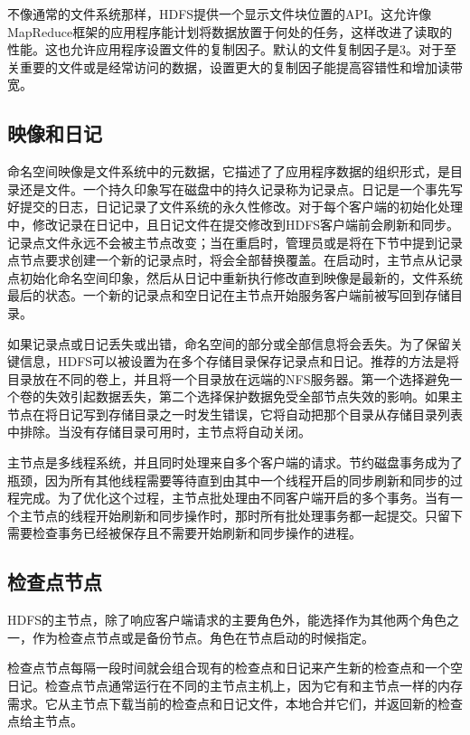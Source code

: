 不像通常的文件系统那样，HDFS提供一个显示文件块位置的API。这允许像MapReduce框架的应用程序能计划将数据放置于何处的任务，这样改进了读取的性能。这也允许应用程序设置文件的复制因子。默认的文件复制因子是3。对于至关重要的文件或是经常访问的数据，设置更大的复制因子能提高容错性和增加读带宽。

\subsection{映像和日记}

命名空间映像是文件系统中的元数据，它描述了了应用程序数据的组织形式，是目录还是文件。一个持久印象写在磁盘中的持久记录称为记录点。日记是一个事先写好提交的日志，日记记录了文件系统的永久性修改。对于每个客户端的初始化处理中，修改记录在日记中，且日记文件在提交修改到HDFS客户端前会刷新和同步。记录点文件永远不会被主节点改变；当在重启时，管理员或是将在下节中提到记录点节点要求创建一个新的记录点时，将会全部替换覆盖。在启动时，主节点从记录点初始化命名空间印象，然后从日记中重新执行修改直到映像是最新的，文件系统最后的状态。一个新的记录点和空日记在主节点开始服务客户端前被写回到存储目录。

如果记录点或日记丢失或出错，命名空间的部分或全部信息将会丢失。为了保留关键信息，HDFS可以被设置为在多个存储目录保存记录点和日记。推荐的方法是将目录放在不同的卷上，并且将一个目录放在远端的NFS服务器。第一个选择避免一个卷的失效引起数据丢失，第二个选择保护数据免受全部节点失效的影响。如果主节点在将日记写到存储目录之一时发生错误，它将自动把那个目录从存储目录列表中排除。当没有存储目录可用时，主节点将自动关闭。

主节点是多线程系统，并且同时处理来自多个客户端的请求。节约磁盘事务成为了瓶颈，因为所有其他线程需要等待直到由其中一个线程开启的同步刷新和同步的过程完成。为了优化这个过程，主节点批处理由不同客户端开启的多个事务。当有一个主节点的线程开始刷新和同步操作时，那时所有批处理事务都一起提交。只留下需要检查事务已经被保存且不需要开始刷新和同步操作的进程。

\subsection{检查点节点}

HDFS的主节点，除了响应客户端请求的主要角色外，能选择作为其他两个角色之一，作为检查点节点或是备份节点。角色在节点启动的时候指定。

检查点节点每隔一段时间就会组合现有的检查点和日记来产生新的检查点和一个空日记。检查点节点通常运行在不同的主节点主机上，因为它有和主节点一样的内存需求。它从主节点下载当前的检查点和日记文件，本地合并它们，并返回新的检查点给主节点。

